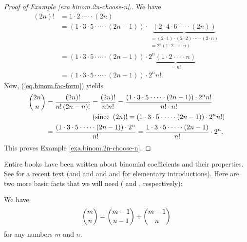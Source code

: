 \begin{proof}
[Proof of Example \ref{exa.binom.2n-choose-n}.]We have%
\begin{align*}
\left(  2n\right)  !  &  =1\cdot2\cdot\cdots\cdot\left(  2n\right) \\
&  =\left(  1\cdot3\cdot5\cdot\cdots\cdot\left(  2n-1\right)  \right)
\cdot\underbrace{\left(  2\cdot4\cdot6\cdot\cdots\cdot\left(  2n\right)
\right)  }_{\substack{=\left(  2\cdot1\right)  \cdot\left(  2\cdot2\right)
\cdot\cdots\cdot\left(  2\cdot n\right)  \\=2^{n}\left(  1\cdot2\cdot
\cdots\cdot n\right)  }}\\
&  =\left(  1\cdot3\cdot5\cdot\cdots\cdot\left(  2n-1\right)  \right)
\cdot2^{n}\underbrace{\left(  1\cdot2\cdot\cdots\cdot n\right)  }_{=n!}\\
&  =\left(  1\cdot3\cdot5\cdot\cdots\cdot\left(  2n-1\right)  \right)
\cdot2^{n}n!.
\end{align*}
Now, (\ref{eq.binom.fac-form}) yields%
\begin{align*}
\dbinom{2n}{n}  &  =\dfrac{\left(  2n\right)  !}{n!\left(  2n-n\right)
!}=\dfrac{\left(  2n\right)  !}{n!n!}=\dfrac{\left(  1\cdot3\cdot5\cdot
\cdots\cdot\left(  2n-1\right)  \right)  \cdot2^{n}n!}{n!\cdot n!}\\
&  \ \ \ \ \ \ \ \ \ \ \ \ \ \ \ \ \ \ \ \ \left(  \text{since }\left(
2n\right)  !=\left(  1\cdot3\cdot5\cdot\cdots\cdot\left(  2n-1\right)
\right)  \cdot2^{n}n!\right) \\
&  =\dfrac{\left(  1\cdot3\cdot5\cdot\cdots\cdot\left(  2n-1\right)  \right)
\cdot2^{n}}{n!}=\dfrac{1\cdot3\cdot5\cdot\cdots\cdot\left(  2n-1\right)  }%
{n!}\cdot2^{n}.
\end{align*}
This proves Example \ref{exa.binom.2n-choose-n}.
\end{proof}

Entire books have been written about binomial coefficients and their
properties. See \cite{Spivey19} for a recent text (and \cite[Chapter 5]{GKP}
and \cite[Chapter 3]{detnotes} and \cite[\S 1.2.6]{Knuth-TAoCP1} and
\cite[Chapter 2]{Wildon19} for elementary introductions). Here are two more
basic facts that we will need (\cite[Theorem 1.3.8]{19fco} and
\cite[Proposition 1.3.6]{19fco}, respectively):

\begin{proposition}
\label{prop.binom.rec}We have%
\begin{equation}
\dbinom{m}{n}=\dbinom{m-1}{n-1}+\dbinom{m-1}{n} \label{eq.binom.rec.m}%
\end{equation}
for any numbers $m$ and $n$.
\end{proposition}


